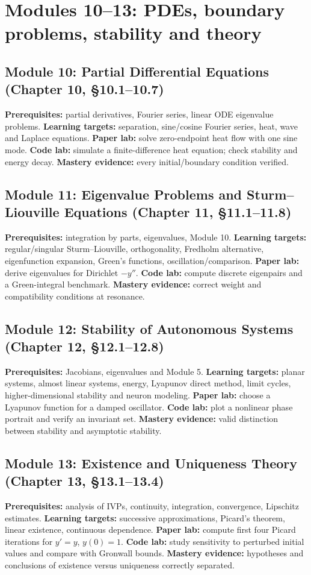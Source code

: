 \documentclass[11pt,letterpaper,oneside]{report}
\theoremstyle{definition}\newtheorem{definition}[theorem]{Definition}
\theoremstyle{remark}\newtheorem{remark}[theorem]{Remark}
\begin{document}
\chapter{Modules 10--13: PDEs, boundary problems, stability and theory}
\section{Module 10: Partial Differential Equations (Chapter 10, \S10.1--10.7)}
\textbf{Prerequisites:} partial derivatives, Fourier series, linear ODE eigenvalue problems. \textbf{Learning targets:} separation, sine/cosine Fourier series, heat, wave and Laplace equations. \textbf{Paper lab:} solve zero-endpoint heat flow with one sine mode. \textbf{Code lab:} simulate a finite-difference heat equation; check stability and energy decay. \textbf{Mastery evidence:} every initial/boundary condition verified.
\section{Module 11: Eigenvalue Problems and Sturm--Liouville Equations (Chapter 11, \S11.1--11.8)}
\textbf{Prerequisites:} integration by parts, eigenvalues, Module 10. \textbf{Learning targets:} regular/singular Sturm--Liouville, orthogonality, Fredholm alternative, eigenfunction expansion, Green's functions, oscillation/comparison. \textbf{Paper lab:} derive eigenvalues for Dirichlet $-y''$. \textbf{Code lab:} compute discrete eigenpairs and a Green-integral benchmark. \textbf{Mastery evidence:} correct weight and compatibility conditions at resonance.
\section{Module 12: Stability of Autonomous Systems (Chapter 12, \S12.1--12.8)}
\textbf{Prerequisites:} Jacobians, eigenvalues and Module 5. \textbf{Learning targets:} planar systems, almost linear systems, energy, Lyapunov direct method, limit cycles, higher-dimensional stability and neuron modeling. \textbf{Paper lab:} choose a Lyapunov function for a damped oscillator. \textbf{Code lab:} plot a nonlinear phase portrait and verify an invariant set. \textbf{Mastery evidence:} valid distinction between stability and asymptotic stability.
\section{Module 13: Existence and Uniqueness Theory (Chapter 13, \S13.1--13.4)}
\textbf{Prerequisites:} analysis of IVPs, continuity, integration, convergence, Lipschitz estimates. \textbf{Learning targets:} successive approximations, Picard's theorem, linear existence, continuous dependence. \textbf{Paper lab:} compute first four Picard iterations for $y'=y$, $y(0)=1$. \textbf{Code lab:} study sensitivity to perturbed initial values and compare with Gronwall bounds. \textbf{Mastery evidence:} hypotheses and conclusions of existence versus uniqueness correctly separated.
\end{document}
